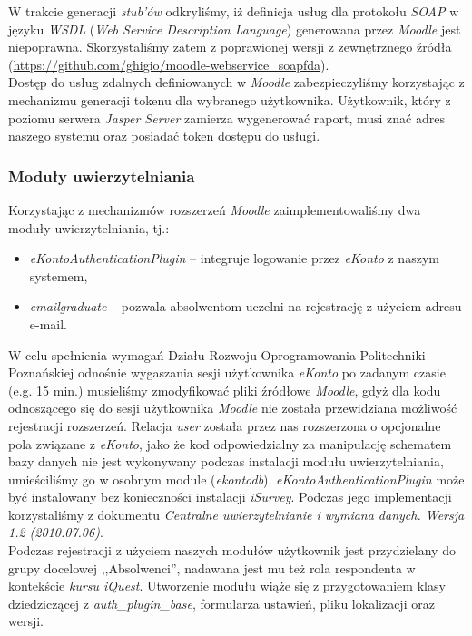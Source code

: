 W trakcie generacji \emph{stub'ów} odkryliśmy, iż definicja usług dla protokołu \emph{SOAP} w języku \emph{WSDL} (\emph{Web Service Description Language}) generowana przez \emph{Moodle} jest niepoprawna. Skorzystaliśmy zatem z poprawionej wersji z zewnętrznego źródła (\url{https://github.com/ghigio/moodle-webservice_soapfda}).\\

Dostęp do usług zdalnych definiowanych w \emph{Moodle} zabezpieczyliśmy korzystając z mechanizmu generacji tokenu dla wybranego użytkownika. Użytkownik, który z poziomu serwera \emph{Jasper Server} zamierza wygenerować raport, musi znać adres naszego systemu oraz posiadać token dostępu do usługi.

\subsubsection{Moduły uwierzytelniania}
Korzystając z mechanizmów rozszerzeń \emph{Moodle} zaimplementowaliśmy dwa moduły uwierzytelniania, tj.:
\begin{itemize}
\item \emph{eKontoAuthenticationPlugin} -- integruje logowanie przez \emph{eKonto} z naszym systemem,
\item \emph{emailgraduate} -- pozwala absolwentom uczelni na rejestrację z użyciem adresu e-mail.
\end{itemize}

W celu spełnienia wymagań Działu Rozwoju Oprogramowania Politechniki Poznańskiej odnośnie wygaszania sesji użytkownika \emph{eKonto} po zadanym czasie (e.g. 15 min.) musieliśmy zmodyfikować pliki źródłowe \emph{Moodle}, gdyż dla kodu odnoszącego się do sesji użytkownika \emph{Moodle} nie została przewidziana możliwość rejestracji rozszerzeń. Relacja \emph{user} została przez nas rozszerzona o opcjonalne pola związane z \emph{eKonto}, jako że kod odpowiedzialny za manipulację schematem bazy danych nie jest wykonywany podczas instalacji modułu uwierzytelniania, umieściliśmy go w osobnym module (\emph{ekontodb}). \emph{eKontoAuthenticationPlugin} może być instalowany bez konieczności instalacji \emph{iSurvey}. Podczas jego implementacji korzystaliśmy z dokumentu \emph{Centralne uwierzytelnianie i wymiana danych. Wersja 1.2 (2010.07.06)}.\\

Podczas rejestracji z użyciem naszych modułów użytkownik jest przydzielany do grupy docelowej ,,Absolwenci'', nadawana jest mu też rola respondenta w kontekście \emph{kursu iQuest}. Utworzenie modułu wiąże się z przygotowaniem klasy dziedziczącej z \emph{auth\_plugin\_base}, formularza ustawień, pliku lokalizacji oraz wersji.

